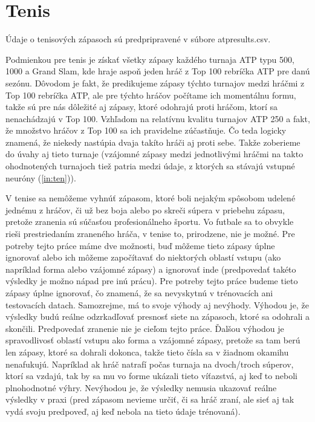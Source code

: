 \section{Tenis}
Údaje o tenisových zápasoch sú predpripravené v súbore atpresults.csv.

Podmienkou pre tenis je získať všetky zápasy každého turnaja ATP typu 500, 1000 a Grand Slam, kde hraje aspoň jeden hráč z Top 100 rebríčka ATP pre danú sezónu.
Dôvodom je fakt, že predikujeme zápasy týchto turnajov medzi hráčmi z Top 100 rebríčka ATP, ale pre týchto hráčov počítame ich momentálnu formu, takže sú pre nás dôležité aj zápasy, ktoré odohrajú proti hráčom, ktorí sa nenachádzajú v Top 100.
Vzhľadom na relatívnu kvalitu turnajov ATP 250 a fakt, že množstvo hráčov z Top 100 sa ich pravidelne zúčastňuje.
Čo teda logicky znamená, že niekedy nastúpia dvaja takíto hráči aj proti sebe. 
Takže zoberieme do úvahy aj tieto turnaje (vzájomné zápasy medzi jednotlivými hráčmi na takto ohodnotených turnajoch tiež patria medzi údaje, z ktorých sa stávajú vstupné neuróny (\ref{in:ten})). 

V tenise sa nemôžeme vyhnúť zápasom, ktoré boli nejakým spôsobom udelené jednému z hráčov, či už bez boja alebo po skreči súpera v priebehu zápasu, pretože zranenia sú súčasťou profesionálneho športu.
Vo futbale sa to obvykle rieši prestriedaním zraneného hráča, v tenise to, prirodzene, nie je možné.
Pre potreby tejto práce máme dve možnosti, buď môžeme tieto zápasy úplne ignorovať alebo ich môžeme započítavať do niektorých oblastí vstupu (ako napríklad forma alebo vzájomné zápasy) a ignorovať inde (predpovedať takéto výsledky je možno nápad pre inú prácu). 
Pre potreby tejto práce budeme tieto zápasy úplne ignorovať, čo znamená, že sa nevyskytnú v trénovacích ani testovacích datach.
Samozrejme, má to svoje výhody aj nevýhody.
Výhodou je, že výsledky budú reálne odzrkadľovať presnosť siete na zápasoch, ktoré sa odohrali a skončili.
Predpovedať zranenie nie je cieľom tejto práce.
Ďalšou výhodou je spravodlivosť oblastí vstupu ako forma a vzájomné zápasy, pretože sa tam berú len zápasy, ktoré sa dohrali dokonca, takže tieto čísla sa v žiadnom okamihu nenafukujú. Napríklad ak hráč natrafí počas turnaja na dvoch/troch súperov, ktorí sa vzdajú, tak by sa mu vo forme ukázali tieto víťazstvá, aj keď to neboli plnohodnotné výhry.
Nevýhodou je, že výsledky nemusia ukazovať reálne výsledky v praxi (pred zápasom nevieme určiť, či sa hráč zraní, ale sieť aj tak vydá svoju predpoveď, aj keď nebola na tieto údaje trénovaná).

